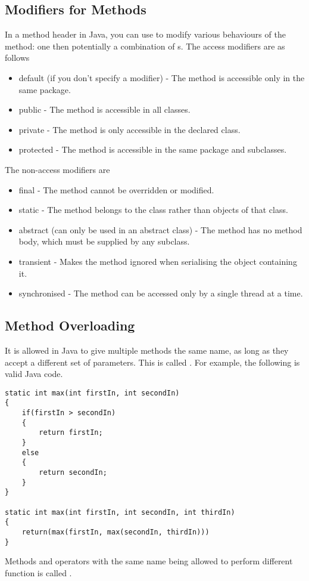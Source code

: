 \documentclass[11pt]{article}
\begin{document}
\subsection{Modifiers for Methods}
In a method header in Java, you can use  to modify various behaviours of the method: one  then potentially a combination of s. The access modifiers are as follows
\begin{itemize}
    \item default (if you don't specify a modifier) - The method is accessible only in the same package.
    \item public - The method is accessible in all classes.
    \item private - The method is only accessible in the declared class.
    \item protected - The method is accessible in the same package and subclasses.
\end{itemize}
The non-access modifiers are
\begin{itemize}
    \item final - The method cannot be overridden or modified.
    \item static - The method belongs to the class rather than objects of that class.
    \item abstract (can only be used in an abstract class) - The method has no method body, which must be supplied by any subclass.
    \item transient - Makes the method ignored when serialising the object containing it.
    \item synchronised - The method can be accessed only by a single thread at a time.
\end{itemize}
\pagebreak
\subsection{Method Overloading}
It is allowed in Java to give multiple methods the same name, as long as they accept a different set of parameters. This is called . For example, the following is valid Java code.
\begin{lstlisting}
static int max(int firstIn, int secondIn)
{
    if(firstIn > secondIn)
    {
        return firstIn;
    }
    else
    {
        return secondIn;
    }
}

static int max(int firstIn, int secondIn, int thirdIn)
{
    return(max(firstIn, max(secondIn, thirdIn)))
}
\end{lstlisting}
\begin{defi}[Polymorphism]
    Methods and operators with the same name being allowed to perform different function is called .
\end{defi}
\pagebreak
\end{document}
